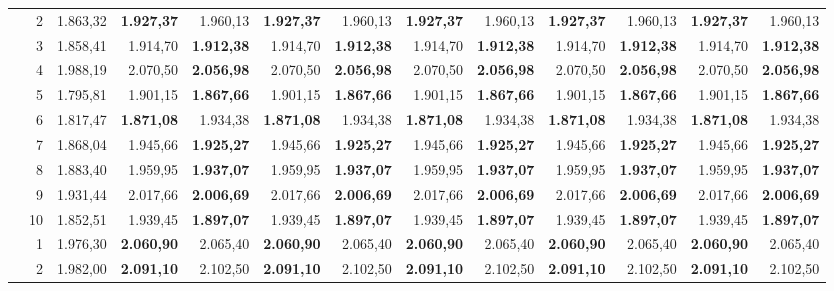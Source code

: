 \documentclass[11pt,a4paper]{article}
\begin{document}
\begin{table}[!htbp]
{\begin{tabular}{rrr rr rr rr rr rr}
 & 2 & 1.863{,}32 & \textbf{1.927{,}37} & 1.960{,}13 & \textbf{1.927{,}37} & 1.960{,}13 & \textbf{1.927{,}37} & 1.960{,}13 & \textbf{1.927{,}37} & 1.960{,}13 & \textbf{1.927{,}37} & 1.960{,}13 \\
 & 3 & 1.858{,}41 & 1.914{,}70 & \textbf{1.912{,}38} & 1.914{,}70 & \textbf{1.912{,}38} & 1.914{,}70 & \textbf{1.912{,}38} & 1.914{,}70 & \textbf{1.912{,}38} & 1.914{,}70 & \textbf{1.912{,}38} \\
 & 4 & 1.988{,}19 & 2.070{,}50 & \textbf{2.056{,}98} & 2.070{,}50 & \textbf{2.056{,}98} & 2.070{,}50 & \textbf{2.056{,}98} & 2.070{,}50 & \textbf{2.056{,}98} & 2.070{,}50 & \textbf{2.056{,}98} \\
 & 5 & 1.795{,}81 & 1.901{,}15 & \textbf{1.867{,}66} & 1.901{,}15 & \textbf{1.867{,}66} & 1.901{,}15 & \textbf{1.867{,}66} & 1.901{,}15 & \textbf{1.867{,}66} & 1.901{,}15 & \textbf{1.867{,}66} \\
 & 6 & 1.817{,}47 & \textbf{1.871{,}08} & 1.934{,}38 & \textbf{1.871{,}08} & 1.934{,}38 & \textbf{1.871{,}08} & 1.934{,}38 & \textbf{1.871{,}08} & 1.934{,}38 & \textbf{1.871{,}08} & 1.934{,}38 \\
 & 7 & 1.868{,}04 & 1.945{,}66 & \textbf{1.925{,}27} & 1.945{,}66 & \textbf{1.925{,}27} & 1.945{,}66 & \textbf{1.925{,}27} & 1.945{,}66 & \textbf{1.925{,}27} & 1.945{,}66 & \textbf{1.925{,}27} \\
 & 8 & 1.883{,}40 & 1.959{,}95 & \textbf{1.937{,}07} & 1.959{,}95 & \textbf{1.937{,}07} & 1.959{,}95 & \textbf{1.937{,}07} & 1.959{,}95 & \textbf{1.937{,}07} & 1.959{,}95 & \textbf{1.937{,}07} \\
 & 9 & 1.931{,}44 & 2.017{,}66 & \textbf{2.006{,}69} & 2.017{,}66 & \textbf{2.006{,}69} & 2.017{,}66 & \textbf{2.006{,}69} & 2.017{,}66 & \textbf{2.006{,}69} & 2.017{,}66 & \textbf{2.006{,}69} \\
 & 10 & 1.852{,}51 & 1.939{,}45 & \textbf{1.897{,}07} & 1.939{,}45 & \textbf{1.897{,}07} & 1.939{,}45 & \textbf{1.897{,}07} & 1.939{,}45 & \textbf{1.897{,}07} & 1.939{,}45 & \textbf{1.897{,}07} \\
\addlinespace
200 & 1 & 1.976{,}30 & \textbf{2.060{,}90} & 2.065{,}40 & \textbf{2.060{,}90} & 2.065{,}40 & \textbf{2.060{,}90} & 2.065{,}40 & \textbf{2.060{,}90} & 2.065{,}40 & \textbf{2.060{,}90} & 2.065{,}40 \\
 & 2 & 1.982{,}00 & \textbf{2.091{,}10} & 2.102{,}50 & \textbf{2.091{,}10} & 2.102{,}50 & \textbf{2.091{,}10} & 2.102{,}50 & \textbf{2.091{,}10} & 2.102{,}50 & \textbf{2.091{,}10} & 2.102{,}50 \\

\end{tabular}}
\end{table}
\end{document}
